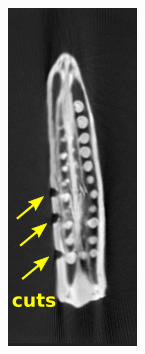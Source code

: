 \documentclass[journal]{IEEEtran}
\begin{document}
\begin{figure}[!h]
\begin{subfigure}[b]{0.18\linewidth}
\captionsetup{labelformat=empty}
        \caption{}
    \end{subfigure}
     \begin{subfigure}[b]{0.18\linewidth}
        \includegraphics[width=\textwidth]{../images/okra/template1_marked.png}

\end{subfigure}
\end{figure}
\end{document}
